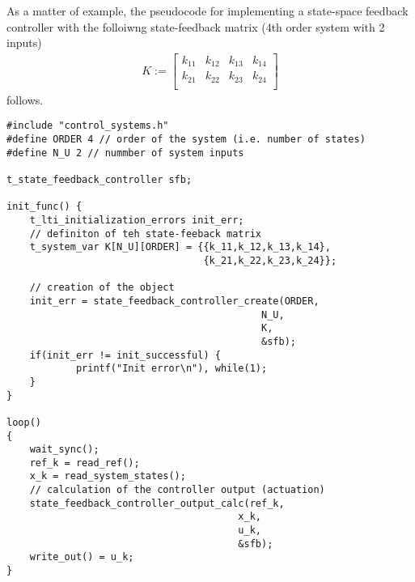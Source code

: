 \documentclass[12pt]{Template_}
\begin{document}
As a matter of example, the pseudocode for implementing a state-space feedback controller with the folloiwng state-feedback matrix (4th order system with 2 inputs)
\[
\begin{array}{cccc}
 K:=\left[ \begin{array}{cccc}
 k_{11} & k_{12} & k_{13} & k_{14}\\
 k_{21} & k_{22} & k_{23} & k_{24}\\
 \end{array}
 \right]
 \end{array}
\]
follows.

\begin{verbatim}
#include "control_systems.h"
#define ORDER 4 // order of the system (i.e. number of states)
#define N_U 2 // nummber of system inputs

t_state_feedback_controller sfb;

init_func() {
    t_lti_initialization_errors init_err;   
    // definiton of teh state-feeback matrix    
    t_system_var K[N_U][ORDER] = {{k_11,k_12,k_13,k_14},
                                  {k_21,k_22,k_23,k_24}};

    // creation of the object
    init_err = state_feedback_controller_create(ORDER, 
                                            N_U, 
                                            K,
                                            &sfb);										
    if(init_err != init_successful) {
            printf("Init error\n"), while(1);
    }
}

loop() 
{
    wait_sync();
    ref_k = read_ref();
    x_k = read_system_states();
    // calculation of the controller output (actuation)
    state_feedback_controller_output_calc(ref_k, 
                                        x_k, 
                                        u_k, 
                                        &sfb);
    write_out() = u_k;
}
	
\end{verbatim}

\newpage
\end{document}
